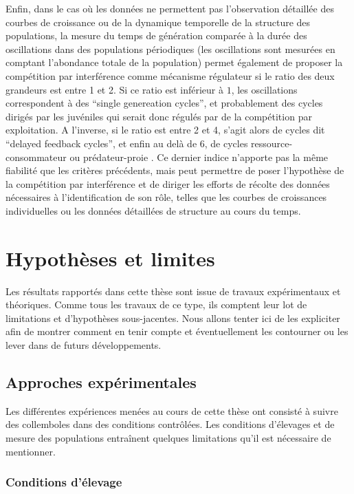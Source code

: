 Enfin, dans le cas où les données ne permettent pas l'observation détaillée des
courbes de croissance ou de la dynamique temporelle de la structure des
populations, la mesure du temps de génération comparée à la durée des
oscillations dans des populations périodiques (les oscillations sont mesurées en
comptant l'abondance totale de la population) permet également de proposer la
compétition par interférence comme mécanisme régulateur si le ratio des deux
grandeurs est entre 1 et 2. Si ce ratio est inférieur à $1$, les oscillations
correspondent à des ``single genereation cycles'', et probablement des cycles
dirigés par les juvéniles qui serait donc régulés par de la compétition par
exploitation. A l'inverse, si le ratio est entre 2 et 4, s'agit alors de cycles
dit ``delayed feedback cycles'', et enfin au delà de 6, de cycles
ressource-consommateur ou prédateur-proie \autocites{murdoch2002a}. Ce dernier
indice n'apporte pas la même fiabilité que les critères précédents, mais peut
permettre de poser l'hypothèse de la compétition par interférence et de diriger
les efforts de récolte des données nécessaires à l'identification de son rôle,
telles que les courbes de croissances individuelles ou les données détaillées de
structure au cours du temps.

\section{Hypothèses et limites}

Les résultats rapportés dans cette thèse sont issue de travaux expérimentaux et
théoriques. Comme tous les travaux de ce type, ils comptent leur lot de
limitations et d'hypothèses sous-jacentes. Nous allons tenter ici de les
expliciter afin de montrer comment en tenir compte et éventuellement les
contourner ou les lever dans de futurs développements.

\subsection{Approches expérimentales}

Les différentes expériences menées au cours de cette thèse ont consisté à
suivre des collemboles dans des conditions contrôlées. Les conditions d'élevages et de
mesure des populations entraînent quelques limitations qu'il est nécessaire de
mentionner.

\subsubsection{Conditions d'élevage}

